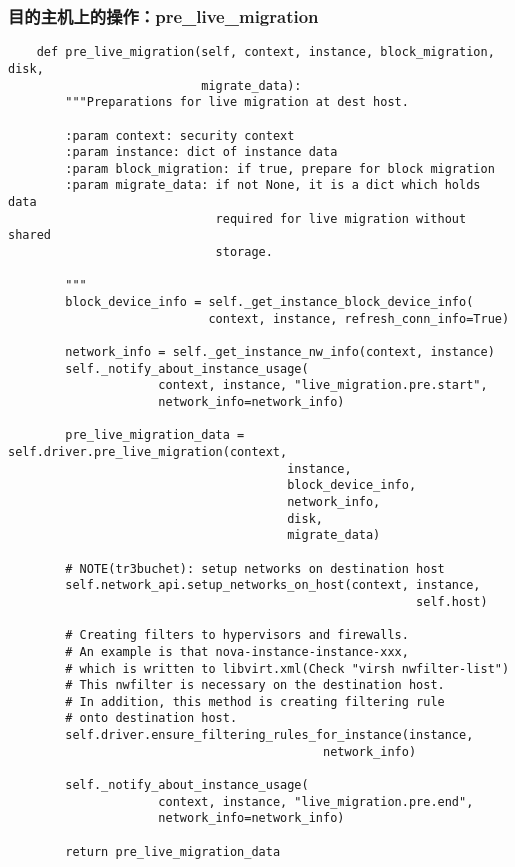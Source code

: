 \documentclass[a4paper,left=1.5cm,right=1.5cm,11pt]{article}
\begin{document}
\subsubsection{目的主机上的操作：pre\_live\_migration}
    \begin{lstlisting}
    def pre_live_migration(self, context, instance, block_migration, disk,
                           migrate_data):
        """Preparations for live migration at dest host.

        :param context: security context
        :param instance: dict of instance data
        :param block_migration: if true, prepare for block migration
        :param migrate_data: if not None, it is a dict which holds data
                             required for live migration without shared
                             storage.

        """
        block_device_info = self._get_instance_block_device_info(
                            context, instance, refresh_conn_info=True)

        network_info = self._get_instance_nw_info(context, instance)
        self._notify_about_instance_usage(
                     context, instance, "live_migration.pre.start",
                     network_info=network_info)

        pre_live_migration_data = self.driver.pre_live_migration(context,
                                       instance,
                                       block_device_info,
                                       network_info,
                                       disk,
                                       migrate_data)

        # NOTE(tr3buchet): setup networks on destination host
        self.network_api.setup_networks_on_host(context, instance,
                                                         self.host)

        # Creating filters to hypervisors and firewalls.
        # An example is that nova-instance-instance-xxx,
        # which is written to libvirt.xml(Check "virsh nwfilter-list")
        # This nwfilter is necessary on the destination host.
        # In addition, this method is creating filtering rule
        # onto destination host.
        self.driver.ensure_filtering_rules_for_instance(instance,
                                            network_info)

        self._notify_about_instance_usage(
                     context, instance, "live_migration.pre.end",
                     network_info=network_info)

        return pre_live_migration_data
    \end{lstlisting}
\end{document}

